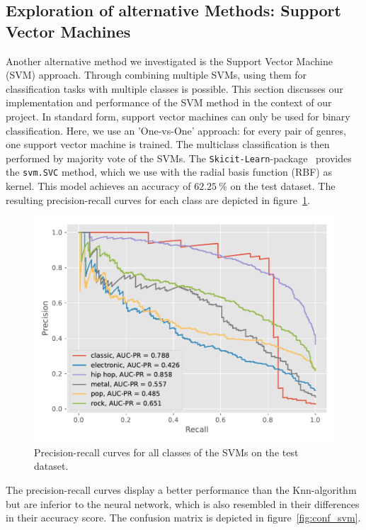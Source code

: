 \documentclass[
  12pt,
  bibliography=totoc,     %
  captions=tableheading,  %
  titlepage=firstiscover, %
]{scrartcl}
\begin{document}
\subsection{Exploration of alternative Methods: Support Vector Machines}
Another alternative method we investigated is the Support Vector Machine (SVM) approach. Through combining multiple SVMs, using them for classification tasks with multiple
classes is possible.
This section discusses our implementation and performance of the SVM method in the context of our project.
In standard form, support vector machines can only be used for binary classification. Here, we use an 'One-vs-One' approach: for every pair of genres, one support vector
machine is trained. The multiclass classification is then performed by majority vote of the SVMs. The \texttt{Skicit-Learn}-package~\cite{scikit-learn} provides the \texttt{svm.SVC} method,
which we use with the radial basis function (RBF) as kernel. This model achieves an accuracy of $\SI{62.25}{\percent}$ on the test dataset. The resulting
precision-recall curves for each class are depicted in figure~\ref{fig:svm_pr}.
\begin{figure}[H]
  \centering
  \includegraphics[scale=0.7]{figures/svm/PR_SVM.pdf}
  \caption{Precision-recall curves for all classes of the SVMs on the test dataset.}
  \label{fig:svm_pr}
\end{figure}
\noindent
The precision-recall curves display a better performance than the Knn-algorithm but are inferior to the neural network, which is also resembled in their differences
in their accuracy score. The confusion matrix is depicted in figure~\ref{fig:conf_svm}.
\end{document}
